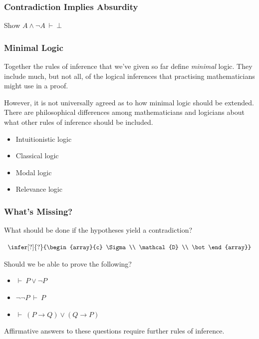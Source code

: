 \documentclass{beamer}
\begin{document}
\begin{frame}
	\frametitle{Contradiction Implies Absurdity}
	
	Show $A \land \lnot A \ \vdash \ \bot$
	
	\vspace{70mm}
	
\end{frame}

\begin{frame}
	\frametitle{Minimal Logic}
	
	Together the rules of inference that we've given so far define \emph{minimal} logic. They include much, but not all, of the logical inferences that practising mathematicians might use in a proof. 
	
	\vspace{5mm}
	
	However, it is not universally agreed as to how minimal logic should be extended. There are philosophical differences among mathematicians and logicians about what other rules of inference should be included. 
	
	\begin{itemize}
		\item Intuitionistic logic
		\item Classical logic 
		\item Modal logic	
		\item Relevance logic	
	\end{itemize}	
\end{frame}

\begin{frame}
  \frametitle{What's Missing?}

	What should be done if the hypotheses yield a contradiction? 

	\begin{center}
		$\begin{array}{c}
		\infer[?]{?}{\begin{array}{c} \Sigma \\ \mathcal{D} \\ \bot \end{array}}
		\end{array}$
	\end{center}

	Should we be able to prove the following? 
	\begin{itemize}
		\item[] $\vdash \ P \lor \lnot P$
		\item[] $\lnot \lnot P \ \vdash \ P$
		\item[] $\vdash \ (P \to Q) \lor (Q \to P)$
	\end{itemize}

	Affirmative answers to these questions require further rules of inference. 

\end{frame}
\end{document}
